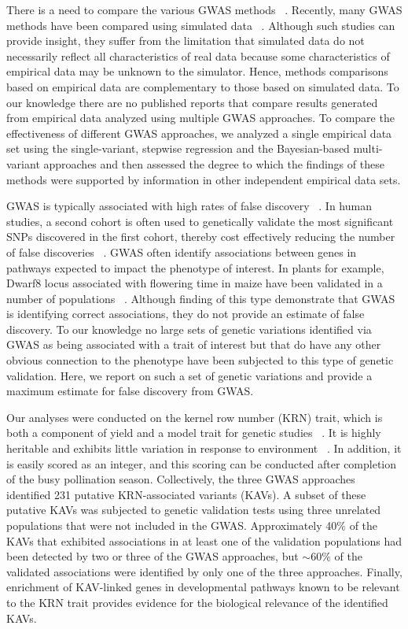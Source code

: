 \documentclass[10pt,letterpaper]{article}
\begin{document}
There is a need to compare the various GWAS methods ~\cite{Bush2012}.  Recently, many GWAS methods have been compared using simulated data ~\cite{Galesloot2014}. Although such studies can provide insight, they suffer from the limitation that simulated data do not necessarily reflect all characteristics of real data because some characteristics of empirical data may be unknown to the simulator. Hence, methods comparisons based on empirical data are complementary to those based on simulated data. To our knowledge there are no published reports that compare results generated from empirical data analyzed using multiple GWAS approaches. To compare the effectiveness of different GWAS approaches, we analyzed a single empirical data set using the single-variant, stepwise regression and the Bayesian-based multi-variant approaches and then assessed the degree to which the findings of these methods were supported by information in other independent empirical data sets.

GWAS is typically associated with high rates of false discovery ~\cite{Visscher2012}. In human studies, a second cohort is often used to genetically validate the most significant SNPs discovered in the first cohort, thereby cost effectively reducing the number of false discoveries ~\cite{Sladek2007}. GWAS often identify associations between genes in pathways expected to impact the phenotype of interest. In plants for example, Dwarf8 locus associated with flowering time in maize have been validated in a number of populations ~\cite{Larsson2013}. Although finding of this type demonstrate that GWAS is identifying correct associations, they do not provide an estimate of false discovery. To our knowledge no large sets of genetic variations identified via GWAS as being associated with a trait of interest but that do have any other obvious connection to the phenotype have been subjected to this type of genetic validation. Here, we report on such a set of genetic variations and provide a maximum estimate for false discovery from GWAS.  

Our analyses were conducted on the kernel row number (KRN) trait, which is both a component of yield and a model trait for genetic studies ~\cite{hallauer2010quantitative}. It is highly heritable and exhibits little variation in response to environment ~\cite{Lu2011}. In addition, it is easily scored as an integer, and this scoring can be conducted after completion of the busy pollination season. Collectively, the three GWAS approaches identified 231 putative KRN-associated variants (KAVs). A subset of these putative KAVs was subjected to genetic validation tests using three unrelated populations that were not included in the GWAS. Approximately 40\% of the KAVs that exhibited associations in at least one of the validation populations had been detected by two or three of the GWAS approaches, but $\sim$60\% of the validated associations were identified by only one of the three approaches. Finally, enrichment of KAV-linked genes in developmental pathways known to be relevant to the KRN trait provides evidence for the biological relevance of the identified KAVs. 
\end{document}
